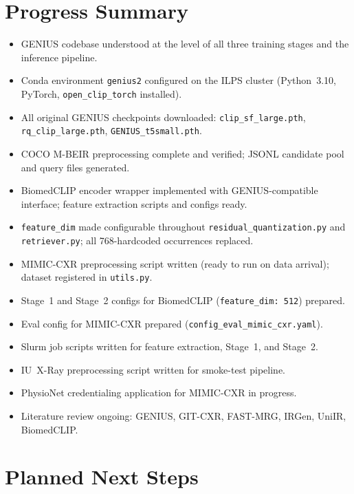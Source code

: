 \documentclass[11pt,a4paper]{article}
\begin{document}
\section{Progress Summary}

\begin{itemize}[itemsep=4pt]
    \item GENIUS codebase understood at the level of all three training stages
    and the inference pipeline.
    \item Conda environment \texttt{genius2} configured on the ILPS cluster
    (Python~3.10, PyTorch, \texttt{open\_clip\_torch} installed).
    \item All original GENIUS checkpoints downloaded:
    \texttt{clip\_sf\_large.pth}, \texttt{rq\_clip\_large.pth},
    \texttt{GENIUS\_t5small.pth}.
    \item COCO M-BEIR preprocessing complete and verified;
    JSONL candidate pool and query files generated.
    \item BiomedCLIP encoder wrapper implemented with GENIUS-compatible
    interface; feature extraction scripts and configs ready.
    \item \texttt{feature\_dim} made configurable throughout
    \texttt{residual\_quantization.py} and \texttt{retriever.py};
    all 768-hardcoded occurrences replaced.
    \item MIMIC-CXR preprocessing script written (ready to run on data arrival);
    dataset registered in \texttt{utils.py}.
    \item Stage~1 and Stage~2 configs for BiomedCLIP (\texttt{feature\_dim: 512})
    prepared.
    \item Eval config for MIMIC-CXR prepared (\texttt{config\_eval\_mimic\_cxr.yaml}).
    \item Slurm job scripts written for feature extraction, Stage~1, and Stage~2.
    \item IU~X-Ray preprocessing script written for smoke-test pipeline.
    \item PhysioNet credentialing application for MIMIC-CXR in progress.
    \item Literature review ongoing: GENIUS, GIT-CXR, FAST-MRG, IRGen, UniIR,
    BiomedCLIP.
\end{itemize}

\section{Planned Next Steps}
\end{document}
